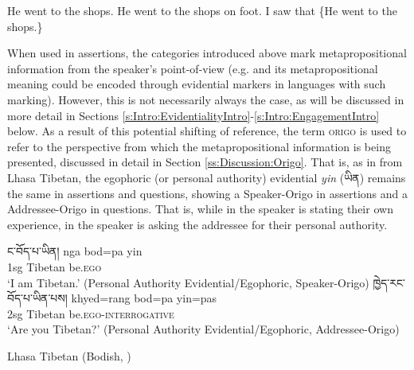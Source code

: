 \begin{exe}
\ex\label{ex:MetapropEnglish}
\begin{xlist}
\ex He went to the shops.
\ex He went to the shops on foot.
\ex I saw that \{He went to the shops.\}\label{ex:MetapropEnglish:c}
\end{xlist}
\end{exe}

When used in assertions, the categories introduced above mark metapropositional information from the speaker's point-of-view (e.g.  and its metapropositional meaning could be encoded through evidential markers in languages with such marking). However, this is not necessarily always the case, as will be discussed in more detail in Sections \ref{s:Intro:EvidentialityIntro}-\ref{s:Intro:EngagementIntro} below. As a result of this potential shifting of reference, the term \textsc{origo} is used to refer to the perspective from which the metapropositional information is being presented, discussed in detail in Section \ref{ss:Discussion:Origo}. That is, as in  from Lhasa Tibetan, the egophoric (or personal authority) evidential \textit{yin} (\foreignlanguage{tibetan}{ཡིན}) remains the same in assertions and questions, showing a Speaker-Origo in assertions and a Addressee-Origo in questions. That is, while in  the speaker is stating their own experience, in  the speaker is asking the addressee for their personal authority.

\begin{exe}
\ex\label{ex:OrigoShift}
\begin{xlist}
\ex\label{ex:OrigoShift:a} \texttibetan{ང་བོད་པ་ཡིན།}
\gll nga bod=pa yin \\
1sg Tibetan be.\textsc{ego} \\
\glt `I am Tibetan.' (Personal Authority Evidential/Egophoric, Speaker-Origo)
\ex\label{ex:OrigoShift:b} \texttibetan{ཁྱེད་རང་བོད་པ་ཡིན་པས།}
\gll khyed=rang bod=pa yin=pas \\
2sg Tibetan be.\textsc{ego}-\textsc{interrogative} \\
\glt `Are you Tibetan?' (Personal Authority Evidential/Egophoric, Addressee-Origo)
\end{xlist}
Lhasa Tibetan (Bodish, \tibetnat) \cite[394]{DeLancey2017Tibetan}
\end{exe}



